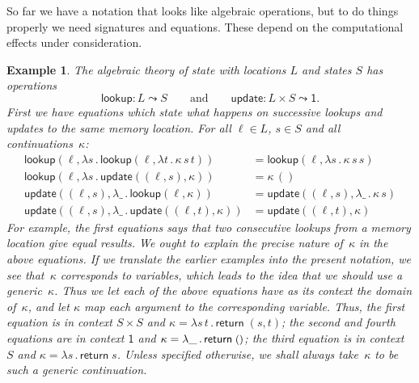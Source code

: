 \documentclass{amsart}
\newcommand{\lam}[1]{\lambda #1 \,.\,}
\newcommand{\leaf}[1]{\return{#1}} %
\newcommand{\opdecl}[3]{#1 : #2 \leadsto #3} %
\newcommand{\one}{\mathsf{1}} %
\newcommand{\unit}{{\text{\small$()$}}} %
\newcommand{\kode}[1]{\mathsf{#1}}
\newcommand{\opcall}[3]{\kode{#1}(#2, #3)}
\newcommand{\return}[1]{\kode{return}\;#1}
\newtheorem{example}{Example}[section]
\begin{document}
So far we have a notation that looks like algebraic operations, but to do things
properly we need signatures and equations. These depend on the computational
effects under consideration.

\begin{example}
  \label{ex:theory-state}
  The algebraic theory of \emph{state} with \emph{locations $L$} and
  \emph{states $S$} has operations
  \begin{equation*}
    \opdecl{\kode{lookup}}{L}{S}
    \qquad\text{and}\qquad
    \opdecl{\kode{update}}{L \times S}{\one}.
  \end{equation*}
  First we have equations which state what happens on successive lookups and
  updates to the same memory location. For all $\ell \in L$, $s \in S$ and
  all continuations~$\kappa$:
  \begin{align*}
    \opcall{lookup}{\ell}{
      \lam{s}{
        \opcall{lookup}{\ell}{
        \lam{t} \kappa \, s \, t}
      }
    } &=
    \opcall{lookup}{\ell}{\lam{s}{\kappa \, s \, s}}
    \\
    \opcall{lookup}{\ell}{
      \lam{s} \opcall{update}{(\ell, s)}{\kappa}
    } &=
    \kappa \, ()
    \\
    \opcall{update}{(\ell, s)}{
      \lam{\_} \opcall{lookup}{\ell}{\kappa}
    } &=
    \opcall{update}{(\ell, s)}{\lam{\_} \kappa \, s}
    \\
    \opcall{update}{(\ell, s)}{
      \lam{\_} \opcall{update}{(\ell, t)}{\kappa}
    } &=
    \opcall{update}{(\ell, t)}{\kappa}
  \end{align*}
  For example, the first equations says that two consecutive lookups from a
  memory location give equal results. We ought to explain the precise nature
  of~$\kappa$ in the above equations. If we translate the earlier examples into
  the present notation, we see that~$\kappa$ corresponds to variables, which
  leads to the idea that we should use a \emph{generic}~$\kappa$. Thus we let
  each of the above equations have as its context the domain of~$\kappa$, and
  let $\kappa$ map each argument to the corresponding variable. Thus, the first
  equation is in context $S \times S$ and
  $\kappa = \lam{s \, t } \leaf {(s, t)}$; the second and fourth equations are
  in context $\one$ and $\kappa = \lam{\_} \leaf{\unit}$; the third equation is
  in context $S$ and $\kappa = \lam{s} \leaf{s}$. Unless specified otherwise, we
  shall always take~$\kappa$ to be such a generic continuation.


\end{example}
\end{document}
